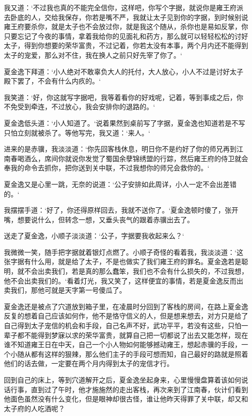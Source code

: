 我又道：‘不过我也真的不能完全信你，这样吧，你写个字据，就说你是雍王府派去卧底的人，交给我保存，你若是嘴不严，我就让太子见到你的字据，到时候别说雍王府要杀你，就是太子也不会放过你，就是我这个随从，杀你也是易如反掌，你只要忘记了今夜的事情，拿着我给你的见面礼和药方，那么就可以轻轻松松的讨好太子，得到你想要的荣华富贵，不过记着，你若太没有本事，两个月内还不能得到太子的宠爱，那么对不住，我在换人之前只好先宰了你了。‘

夏金逸下拜道：‘小人绝对不敢辜负大人的托付，大人放心，小人不过是讨好太子殿下罢了，不会有什么内疚的。‘

我笑道：‘好，你这就写字据吧，我等着看你的好戏呢，记着，等到事成之后，你不免受到牵连，不过放心，我会安排你的退路的。‘

夏金逸低头道：‘小人知道了。‘说着果然到桌前写了字据，夏金逸也知道若是不写只怕立刻就被杀了。等他写完，我又道：‘来人。‘

进来的是赤骥，我淡淡道：‘你先回客栈休息，明日你不是约好了你的师兄再到江南春喝酒么，席间你就说你发觉了蜀国余孽锦绣盟的行踪，然后雍王府的侍卫就会奉我的命令去抓你，把你送到关中联，不过我想你的师兄会救你的。‘

夏金逸又是心里一跳，无奈的说道：‘公子安排如此周详，小人一定不会出差错的。‘

我摆摆手道：‘好了，你还得原样回去，我就不送你了。‘夏金逸顿时傻了，张开嘴，想要说什么，但转念一想，又垂头丧气的跟着赤骥出去了。

送走了夏金逸，小顺子淡淡道：‘公子，字据要我收起来么？‘

我微微一笑，随手把字据就着银灯点燃了。小顺子奇怪的看着我，我淡淡道：‘这张字据有什么用，就是给了太子，不是也做实了我们雍王府的罪名。夏金逸若是聪明，就不会出卖我们，若是真的那么蠢笨，我们也不会有什么损失的，不过我想，他不会出卖我们的。‘看着灯光，我又笑了，这样便宜的事情，若是夏金逸反而出卖我们，那他可就是天字第一号傻瓜了。

夏金逸还是被点了穴道放到箱子里，在凌晨时分回到了客栈的房间，在路上夏金逸反复的想着自己应该如何作，他不是恪守信义的人，但是想来想去，对方只是给了自己得到太子宠信的机会和手段，自己名声不好，武功平平，若没有这些，只怕一辈子都不能得到梦寐以求的荣华富贵，就算自己把一切都说了出去又能怎样，现在谁不知道雍王日在中天，自己一个小人物如何能够撼动雍王，想起赤骥的手段，一个小随从都有这样的狠辣，那么他们主子的手段可想而知，自己最好的路就是照着他们的话去做，一定要在两个月内得到太子的宠信才行。

回到自己的床上，等到穴道解开之后，夏金逸坐起身来，心里慢慢盘算着该如何说话行事，直到过了午时，他才施施然的走出客栈，再次来到了江南春，伙计们看到他面色虽然没有什么变化，但是眼神却很古怪，谁让他昨天得罪了关中联，却又和太子府的人吃酒呢？

